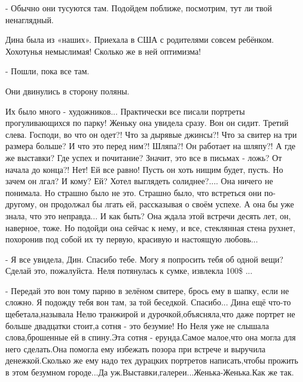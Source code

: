 - Обычно они тусуются там. Подойдем поближе, посмотрим, тут ли твой ненаглядный.

Дина была из «наших». Приехала в США с родителями совсем ребёнком. Хохотунья
немыслимая! Сколько же в ней оптимизма! 

- Пошли, пока все там.

Они двинулись в сторону поляны.

Их было много - художников... Практически все писали портреты прогуливающихся по
парку! Женьку она увидела сразу. Вон он сидит. Третий слева. Господи, во что он
одет?! Что за дырявые джинсы?! Что за свитер на три размера больше? И что это
перед ним?! Шляпа?! Он работает на шляпу?! А где же выставки? Где успех и
почитание? Значит, это все в письмах - ложь? От начала до конца?! Нет! Ей все
равно! Пусть он хоть нищим будет, пусть. Но зачем он лгал? И кому? Ей? Хотел
выглядеть солиднее?.... Она ничего не понимала. Но страшно было не это. Страшно
было, что встреться они по-другому, он продолжал бы лгать ей, рассказывая о своём
успехе. А она бы уже знала, что это неправда... И как быть? Она ждала этой встречи
десять лет, он, наверное, тоже. Но подойди она сейчас к нему, и все, стеклянная
стена рухнет, похоронив под собой их ту первую, красивую и настоящую любовь...

- Я все увидела, Дин. Спасибо тебе. Могу я попросить тебя об одной вещи? Сделай
это, пожалуйста.  Неля потянулась к сумке, извлекла 100\$ ...

- Передай это вон тому парню в зелёном свитере, брось ему в шапку, если не сложно. Я подожду тебя вон там, за той беседкой. Спасибо...
Дина ещё что-то щебетала,называла Нелю транжирой и дурочкой,объясняла,что даже портрет не больше двадцатки стоит,а сотня - это безумие! Но Неля уже не слышала слова,брошенные ей в спину.Эта сотня - ерунда.Самое малое,что она могла для него сделать.Она помогла ему избежать позора при встрече и выручила денежкой.Сколько же ему надо тех дурацких портретов написать,чтобы прожить в этом безумном городе...Да уж.Выставки,галереи...Женька-Женька.Как же так.


